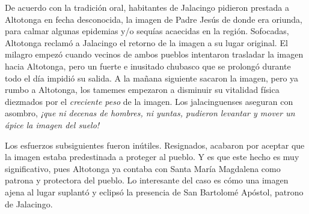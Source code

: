\documentclass[14pt,twoside,final]{extbook} %
\begin{document}
De acuerdo con la tradición oral, habitantes de Jalacingo pidieron prestada a Altotonga en fecha desconocida, la imagen de Padre Jesús de donde era oriunda, para calmar algunas epidemias y/o sequías acaecidas en la región. Sofocadas, Altotonga reclamó a Jalacingo el retorno de la imagen a su lugar original. El milagro empezó cuando vecinos de ambos pueblos intentaron trasladar la imagen hacia Altotonga, pero un fuerte e inusitado chubasco que se prolongó durante todo el día impidió su salida. A la mañana siguiente sacaron la imagen, pero ya rumbo a Altotonga, los tamemes empezaron a disminuir su vitalidad física diezmados por el \emph{creciente peso} de la imagen. Los jalacinguenses aseguran con asombro, \emph{¡que ni decenas de hombres, ni yuntas, pudieron levantar y mover un ápice la imagen del suelo!}

Los esfuerzos subsiguientes fueron inútiles. Resignados, acabaron por aceptar que la imagen estaba predestinada a proteger al pueblo. Y es que este hecho es muy significativo, pues Altotonga ya contaba con Santa María Magdalena como patrona y protectora del pueblo. Lo interesante del caso es cómo una imagen ajena al lugar suplantó y eclipsó la presencia de San Bartolomé Apóstol, patrono de Jalacingo.
\end{document}
